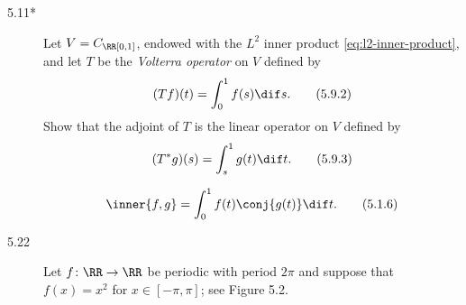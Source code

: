 \documentclass{homework}
\date{Tuesday 2/12}
\author{}
\begin{document}
\begin{description}
\item[5.11*] Let \(V = C_\RR [0, 1]\), endowed with the \(L^2\)
  inner product \eqref{eq:l2-inner-product}, and let \(T\) be the
  \emph{Volterra operator} on \(V\) defined by
  \[
    (Tf)(t) = \int_0^1 f(s) \dif s.
    \tag{5.9.2}
  \]
  Show that the adjoint of \(T\) is the linear operator on \(V\)
  defined by
  \[
    (T^* g)(s) = \int_s^1 g(t) \dif t.
    \tag{5.9.3}
  \]

  \begin{book}
    \[
      \inner{f, g} = \int_0^1 f(t) \conj{g(t)} \dif t.
      \tag{5.1.6}
      \label{eq:l2-inner-product}
    \]
  \end{book}


  \begin{solution}

  \end{solution}

\item[5.22] Let \(f \colon \RR \to \RR\) be periodic with period
  \(2\pi\) and suppose that \(f(x) = x^2\) for \(x \in [-\pi, \pi]\);
  see Figure 5.2.  


  \begin{book}
    \begin{center}

    \end{center}
  \end{book}


\end{description}
\end{document}
